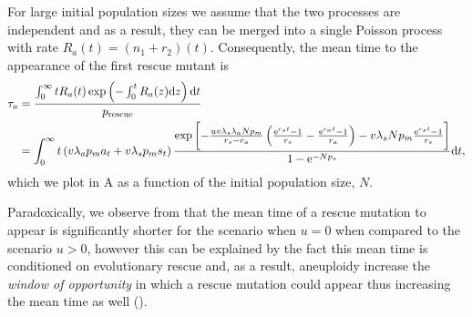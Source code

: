 \documentclass[12pt]{extarticle}
\renewcommand{\d}[1]{\ensuremath{\operatorname{d}\!{#1}}}
\renewcommand{\d}{{\rm d}}
\newcommand{\e}{{\rm e}}
\newcommand{\presc}{p_\text{rescue}}
\renewcommand{\Delta}{r}
\begin{document}
\begin{appendices}
For large initial population sizes we assume that the two processes are independent and as a result, they can be merged into a single Poisson process with rate $R_a(t)=\left(n_1+r_2\right)\left(t\right)$.
Consequently, the mean time to the appearance of the first rescue mutant is
\begin{align}\nonumber
\tau_a &= \frac{\int_{0}^{\infty}{tR_a(t)\exp\left(-\int_0^{t}{R_a(z)\d z}\right) \d t}}{\presc}\\ \label{meantimet2}
&=
\int_0^\infty t\left(v\lambda_ap_ma_t+v\lambda_sp_ms_t\right)\frac{\exp\left[-\frac{uv\lambda_s\lambda_aNp_m}{\Delta_s-\Delta_a}\left(\frac{\e^{\Delta_s t}-1}{\Delta_s}-\frac{\e^{\Delta_a t}-1}{\Delta_a}\right)-v\lambda_sNp_m\frac{\e^{\Delta_s t}-1}{\Delta_s}\right] }{1-\e^{-Np_s}}\d t,
\end{align}
which we plot in A as a function of the initial population size, $N$.

Paradoxically, we observe from  that the mean time of a rescue mutation to appear is significantly shorter for the scenario when $u=0$ when compared to the scenario $u>0$, however this can be explained by the fact this mean time is conditioned on evolutionary rescue and, as a result, aneuploidy increase the \emph{window of opportunity} in which a rescue mutation could appear thus increasing the mean time as well ().


\end{appendices}
\end{document}

